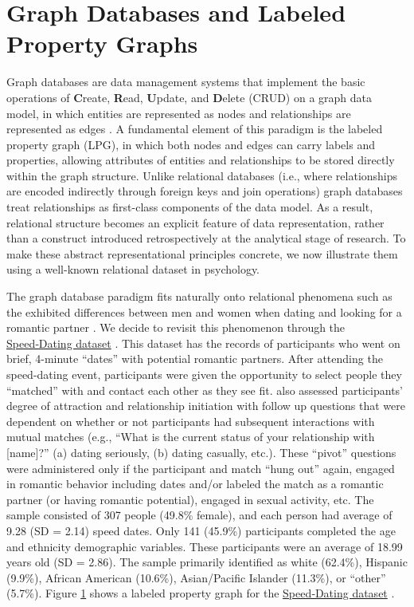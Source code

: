 \documentclass[sn-apa,pdflatex]{sn-jnl}
\theoremstyle{remark}
\theoremstyle{definition}
\begin{document}
\section{Graph Databases and Labeled Property Graphs}\label{sec2}

Graph databases are data management systems that implement the basic
operations of \textbf{C}reate, \textbf{R}ead, \textbf{U}pdate, and
\textbf{D}elete (CRUD) on a graph data model, in which entities are
represented as nodes and relationships are represented as edges
\citep{Robinson2015}. A fundamental element of this paradigm is the
labeled property graph (LPG), in which both nodes and edges can carry
labels and properties, allowing attributes of entities and relationships
to be stored directly within the graph structure. Unlike relational
databases (i.e., where relationships are encoded indirectly through
foreign keys and join operations) graph databases treat relationships as
first-class components of the data model. As a result, relational
structure becomes an explicit feature of data representation, rather
than a construct introduced retrospectively at the analytical stage of
research. To make these abstract representational principles concrete,
we now illustrate them using a well-known relational dataset in
psychology.

The graph database paradigm fits naturally onto relational phenomena
such as the exhibited differences between men and women when dating and
looking for a romantic partner \citep{Selterman2015}. We decide to
revisit this phenomenon through the
\href{https://osf.io/hcfmi/files/h62a3}{Speed‑Dating dataset}
\citep{Selterman2023}. This dataset has the records of participants who
went on brief, 4-minute ``dates'' with potential romantic partners.
After attending the speed-dating event, participants were given the
opportunity to select people they ``matched'' with and contact each
other as they see fit. \citet{Selterman2023} also assessed participants'
degree of attraction and relationship initiation with follow up
questions that were dependent on whether or not participants had
subsequent interactions with mutual matches (e.g., ``What is the current
status of your relationship with {[}name{]}?'' (a) dating seriously, (b)
dating casually, etc.). These ``pivot'' questions were administered only
if the participant and match ``hung out'' again, engaged in romantic
behavior including dates and/or labeled the match as a romantic partner
(or having romantic potential), engaged in sexual activity, etc. The
sample consisted of 307 people (49.8\% female), and each person had
average of 9.28 (SD = 2.14) speed dates. Only 141 (45.9\%) participants
completed the age and ethnicity demographic variables. These
participants were an average of 18.99 years old (SD = 2.86). The sample
primarily identified as white (62.4\%), Hispanic (9.9\%), African
American (10.6\%), Asian/Pacific Islander (11.3\%), or ``other''
(5.7\%). Figure \hyperref[fig:F2]{1} shows a labeled property graph for
the \href{https://osf.io/hcfmi/files/h62a3}{Speed‑Dating dataset}
\citep{Selterman2023}.
\end{document}
